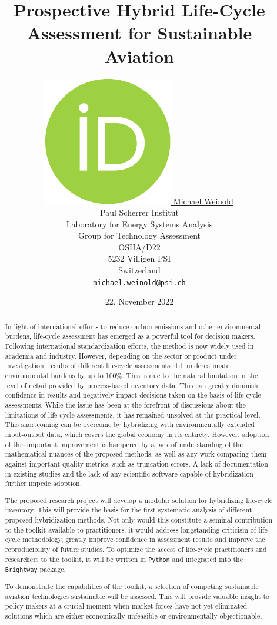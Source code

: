 \documentclass{article}
\title{Prospective Hybrid Life-Cycle Assessment for Sustainable Aviation}
\author{
    \href{https://orcid.org/0000-0003-4859-2650}
    {\includegraphics[scale=0.06]{auxiliary/figures/orcid.pdf}
    \hspace{1mm}
    Michael Weinold} \\
	Paul Scherrer Institut\\
	Laboratory for Energy Systems Analysis\\
	Group for Technology Assessment\\
	OSHA/D22\\
    5232 Villigen PSI \\
    Switzerland \\
	\texttt{michael.weinold@psi.ch} \\
}
\date{22. November 2022}
\begin{document}


\maketitle

\begin{abstract}

    In light of international efforts to reduce carbon emissions and other environmental burdens, life-cycle assessment has emerged as a powerful tool for decision makers. Following international standardization efforts, the method is now widely used in academia and industry. However, depending on the sector or product under investigation, results of different life-cycle assessments still underestimate environmental burdens by up to 100\%. This is due to the natural limitation in the level of detail provided by process-based inventory data. This can greatly diminish confidence in results and negatively impact decisions taken on the basis of life-cycle assessments. While the issue has been at the forefront of discussions about the limitations of life-cycle assessments, it has remained unsolved at the practical level. This shortcoming can be overcome by hybridizing with environmentally extended input-output data, which covers the global economy in its entirety. However, adoption of this important improvement is hampered by a lack of understanding of the mathematical nuances of the proposed methods, as well as any work comparing them against important quality metrics, such as truncation errors. A lack of documentation in existing studies and the lack of any scientific software capable of hybridization further impede adoption.
    
    The proposed research project will develop a modular solution for hybridizing life-cycle inventory. This will provide the basis for the first systematic analysis of different proposed hybridization methods. Not only would this constitute a seminal contribution to the toolkit available to practitioners, it would address longstanding criticism of life-cycle methodology, greatly improve confidence in assessment results and improve the reproducibility of future studies. To optimize the access of life-cycle practitioners and researchers to the toolkit, it will be written in \texttt{Python} and integrated into the \texttt{Brightway} package.

    To demonstrate the capabilities of the toolkit, a selection of competing sustainable aviation technologies sustainable will be assessed. This will provide valuable insight to policy makers at a crucial moment when market forces have not yet eliminated solutions which are either economically unfeasible or environmentally objectionable. 
	
\end{abstract}
\end{document}
